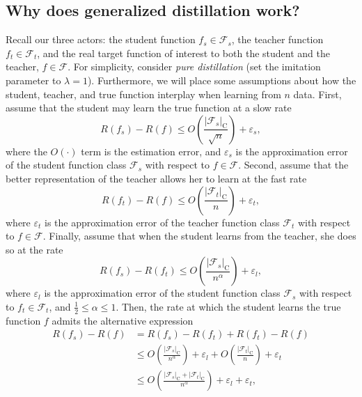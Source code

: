 \documentclass{article}
\begin{document}
\subsection{Why does generalized distillation work?}
Recall our three actors: the student function $f_{s} \in \mathcal{F}_s$, the
teacher function $f_{t} \in \mathcal{F}_t$, and the real target function of
interest to both the student and the teacher, $f \in \mathcal{F}$. For simplicity, consider \emph{pure
distillation} (set the imitation parameter to $\lambda = 1$).
Furthermore, we will place some assumptions about how the student, teacher, and
true function interplay when learning from $n$ data.  First, assume that the
student may learn the true function at a slow rate
\begin{equation*}
  R(f_{s}) - R(f) \leq O\left(\frac{|\mathcal{F}_s|_\textrm{C}}{\sqrt{n}}\right) + \varepsilon_s,
\end{equation*}
where the $O(\cdot)$ term is the estimation error, and $\varepsilon_s$ is the
approximation error of the student function class $\mathcal{F}_s$ with respect
to $f \in \mathcal{F}$. Second, assume that the better representation of the
teacher allows her to learn at the fast rate 
\begin{equation*}
  R(f_{t}) - R(f) \leq O\left(\frac{|\mathcal{F}_t|_\textrm{C}}{n}\right) +
  \varepsilon_t,
\end{equation*}
where $\varepsilon_t$ is the approximation error of the teacher function class
$\mathcal{F}_t$ with respect to $f \in \mathcal{F}$. Finally, assume that when
the student learns from the teacher, she does so at the rate
\begin{equation*}
  R(f_{s}) - R(f_{t}) \leq
  O\left(\frac{|\mathcal{F}_s|_\textrm{C}}{n^{\alpha}}\right) + \varepsilon_l,
\end{equation*}
where $\varepsilon_l$ is the approximation error of the student function class
$\mathcal{F}_s$ with respect to $f_t \in \mathcal{F}_t$, and $\frac{1}{2} \leq
\alpha \leq 1$. Then, the rate at which the student learns the true function
$f$ admits the alternative expression 
\begin{align*}
  R(f_{s})-R(f) &= R(f_{s})-R(f_{t})+R(f_{t})-R(f)\\
                  &\leq
                  O\left(\frac{|\mathcal{F}_s|_\textrm{C}}{n^{\alpha}}\right)
                  + \varepsilon_l +
                  O\left(\frac{|\mathcal{F}_t|_\textrm{C}}{n}\right) +
                  \varepsilon_t\\
                  &\leq O\left(\frac{|\mathcal{F}_s|_\textrm{C} +
                  |\mathcal{F}_t|_\textrm{C}}{n^{\alpha}}\right) +
                  \varepsilon_l + \varepsilon_t,
\end{align*}
\end{document}
